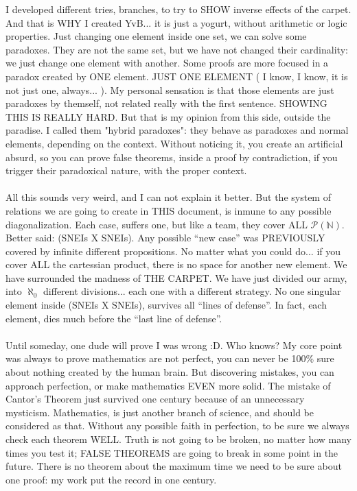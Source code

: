 		\noindent
		I developed different tries, branches, to try to SHOW inverse effects of the carpet. And that is WHY I created YvB... it is just a yogurt, without arithmetic or logic properties. Just changing one element inside one set, we can solve some paradoxes. They are not the same set, but we have not changed their cardinality: we just change one element with another. Some proofs are more focused in a paradox created by ONE element. JUST ONE ELEMENT ( I know, I know, it is not just one, always... ). My personal sensation is that those elements are just paradoxes by themself, not related really with the first sentence. SHOWING THIS IS REALLY HARD. But that is my opinion from this side, outside the paradise. I called them "hybrid paradoxes": they behave as paradoxes and normal elements, depending on the context. Without noticing it, you create an artificial absurd, so you can prove false theorems, inside a proof by contradiction, if you trigger their paradoxical nature, with the proper context.
		\\\\
		
		\noindent
		All this sounds very weird, and I can not explain it better. But the system of relations we are going to create in THIS document, is inmune to any possible diagonalization. Each case, suffers one, but like a team, they cover ALL $\mathcal{P(\mathbb{N})}$. Better said: (SNEIs X SNEIs). Any possible ``new case'' was PREVIOUSLY covered by infinite different propositions. No matter what you could do... if you cover ALL the cartessian product, there is no space for another new element. We have surrounded the madness of THE CARPET. We have just divided our army, into $\aleph_{0}$ different divisions... each one with a different strategy. No one singular element inside (SNEIs X SNEIs), survives all ``lines of defense''. In fact, each element, dies much before the ``last line of defense''.
		\\\\
		
		\noindent
		Until someday, one dude will prove I was wrong :D. Who knows? My core point was always to prove mathematics are not perfect, you can never be 100\% sure about nothing created by the human brain. But discovering mistakes, you can approach perfection, or make mathematics EVEN more solid. The mistake of Cantor's Theorem just survived one century because of an unnecessary mysticism. Mathematics, is just another branch of science, and should be considered as that. Without any possible faith in perfection, to be sure we always check each theorem WELL. Truth is not going to be broken, no matter how many times you test it; FALSE THEOREMS are going to break in some point in the future. There is no theorem about the maximum time we need to be sure about one proof: my work put the record in one century. 
		\\\\
	
